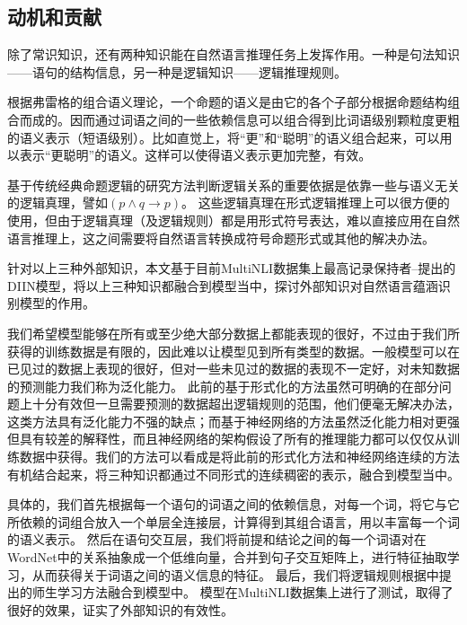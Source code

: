 \documentclass[UTF8,11pt,a4paper,nofonts]{ctexart}
\numberwithin{equation}{section}
\begin{document}




\subsection{动机和贡献}




除了常识知识，还有两种知识能在自然语言推理任务上发挥作用。一种是句法知识——语句的结构信息，另一种是逻辑知识——逻辑推理规则。

根据弗雷格的组合语义理论，一个命题的语义是由它的各个子部分根据命题结构组合而成的。因而通过词语之间的一些依赖信息可以组合得到比词语级别颗粒度更粗的语义表示（短语级别）。比如直觉上，将“更”和“聪明”的语义组合起来，可以用以表示“更聪明”的语义。这样可以使得语义表示更加完整，有效。

基于传统经典命题逻辑的研究方法判断逻辑关系的重要依据是依靠一些与语义无关的逻辑真理，譬如$(p\land q \to p)$。
这些逻辑真理在形式逻辑推理上可以很方便的使用，但由于逻辑真理（及逻辑规则）都是用形式符号表达，难以直接应用在自然语言推理上，这之间需要将自然语言转换成符号命题形式或其他的解决办法。

针对以上三种外部知识，本文基于目前MultiNLI数据集上最高记录保持者--\cite{yichen2018nli}提出的DIIN模型，将以上三种知识都融合到模型当中，探讨外部知识对自然语言蕴涵识别模型的作用。

我们希望模型能够在所有或至少绝大部分数据上都能表现的很好，不过由于我们所获得的训练数据是有限的，因此难以让模型见到所有类型的数据。一般模型可以在已见过的数据上表现的很好，但对一些未见过的数据的表现不一定好，对未知数据的预测能力我们称为泛化能力。
此前的基于形式化的方法虽然可明确的在部分问题上十分有效但一旦需要预测的数据超出逻辑规则的范围，他们便毫无解决办法，这类方法具有泛化能力不强的缺点；而基于神经网络的方法虽然泛化能力相对更强但具有较差的解释性，而且神经网络的架构假设了所有的推理能力都可以仅仅从训练数据中获得。我们的方法可以看成是将此前的形式化方法和神经网络连续的方法有机结合起来，将三种知识都通过不同形式的连续稠密的表示，融合到模型当中。

具体的，我们首先根据每一个语句的词语之间的依赖信息，对每一个词，将它与它所依赖的词组合放入一个单层全连接层，计算得到其组合语言，用以丰富每一个词的语义表示。
然后在语句交互层，我们将前提和结论之间的每一个词语对在WordNet中的关系抽象成一个低维向量，合并到句子交互矩阵上，进行特征抽取学习，从而获得关于词语之间的语义信息的特征。
最后，我们将逻辑规则根据\cite{Hu2016HarnessingDN}中提出的师生学习方法融合到模型中。
模型在MultiNLI数据集上进行了测试，取得了很好的效果，证实了外部知识的有效性。
\end{document}
